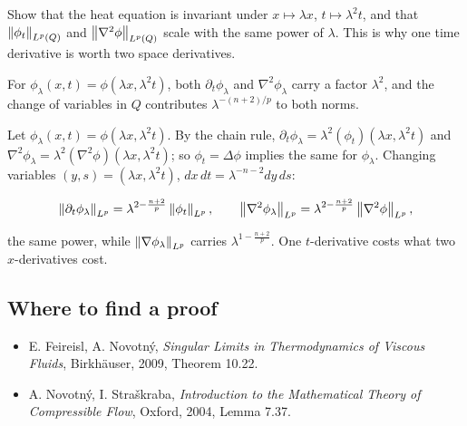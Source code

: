 \begin{exercise}
  Show that the heat equation is invariant under $x \mapsto \lambda x$, $t \mapsto \lambda^2 t$, and that $\left\lVert \phi_t\right\rVert_{L^p(Q)}$ and $\left\lVert \nabla^2\phi\right\rVert_{L^p(Q)}$ scale with the same power of $\lambda$. This is why one time derivative is worth two space derivatives.
  \begin{hint}
    For $\phi_\lambda(x,t) = \phi(\lambda x, \lambda^2 t)$, both $\partial_t\phi_\lambda$ and $\nabla^2\phi_\lambda$ carry a factor $\lambda^2$, and the change of variables in $Q$ contributes $\lambda^{-(n+2)/p}$ to both norms.
  \end{hint}
  \begin{solution}
    Let $\phi_\lambda(x,t) = \phi(\lambda x, \lambda^2t)$. By the chain rule, $\partial_t\phi_\lambda = \lambda^2(\phi_t)(\lambda x,\lambda^2t)$ and $\nabla^2\phi_\lambda = \lambda^2(\nabla^2\phi)(\lambda x,\lambda^2t)$; so $\phi_t = \Delta\phi$ implies the same for $\phi_\lambda$. Changing variables $(y,s) = (\lambda x,\lambda^2t)$, $dx\,dt = \lambda^{-n-2}dy\,ds$:

    \[ \left\lVert \partial_t\phi_\lambda\right\rVert_{L^p} = \lambda^{2 - \frac{n+2}{p}}\left\lVert \phi_t\right\rVert_{L^p}, \qquad
             \left\lVert \nabla^2\phi_\lambda\right\rVert_{L^p} = \lambda^{2 - \frac{n+2}{p}}\left\lVert \nabla^2\phi\right\rVert_{L^p}, \]

    the same power, while $\left\lVert \nabla\phi_\lambda\right\rVert_{L^p}$ carries $\lambda^{1 - \frac{n+2}{p}}$. One $t$-derivative costs what two $x$-derivatives cost.
  \end{solution}
\end{exercise}

\subsection*{Where to find a proof}

\begin{itemize}
\item E. Feireisl, A. Novotný, \emph{Singular Limits in Thermodynamics of Viscous Fluids}, Birkhäuser, 2009, Theorem 10.22.
\item A. Novotný, I. Straškraba, \emph{Introduction to the Mathematical Theory of Compressible Flow}, Oxford, 2004, Lemma 7.37.
\end{itemize}

\neededfor
